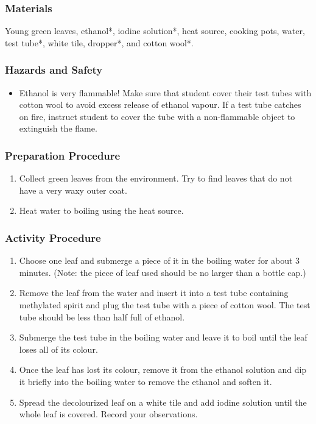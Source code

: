 \subsubsection*{Materials}
Young green leaves, ethanol*, iodine solution*, heat source, cooking pots, water, test tube*, white tile, dropper*, and cotton wool*.

\subsubsection*{Hazards and Safety}
\begin{itemize}
\item{Ethanol is very flammable! Make sure that student cover their test tubes with cotton wool to avoid excess release of ethanol vapour. If a test tube catches on fire, instruct student to cover the tube with a non-flammable object to extinguish the flame.}
\end{itemize}

\subsubsection*{Preparation Procedure}
\begin{enumerate}
\item{Collect green leaves from the environment. Try to find leaves that do not have a very waxy outer coat.}
\item{Heat water to boiling using the heat source.}
\end{enumerate}

\subsubsection*{Activity Procedure}
\begin{enumerate}
\item{Choose one leaf and submerge a piece of it in the boiling water for about 3 minutes. (Note: the piece of leaf used should be no larger than a bottle cap.)}
\item{Remove the leaf from the water and insert it into a test tube containing methylated spirit and plug the test tube with a piece of cotton wool. The test tube should be less than half full of ethanol.}
\item{Submerge the test tube in the boiling water and leave it to boil until the leaf loses all of its colour.}
\item{Once the leaf has lost its colour, remove it from the ethanol solution and dip it briefly into the boiling water to remove the ethanol and soften it.}
\item{Spread the decolourized leaf on a white tile and add iodine solution until the whole leaf is covered. Record your observations.}
\end{enumerate}

